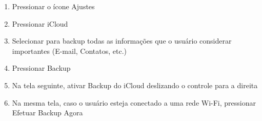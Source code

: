 \begin{enumerate}
\item Pressionar o \'icone Ajustes
\item Pressionar iCloud
\item Selecionar para backup todas as informa\c c\~oes que o usu\'ario considerar importantes (E-mail, Contatos, etc.)
\item Pressionar Backup
\item Na tela seguinte, ativar Backup do iCloud deslizando o controle para a direita
\item Na mesma tela, caso o usu\'ario esteja conectado a uma rede Wi-Fi, pressionar Efetuar Backup Agora   
\end{enumerate}
